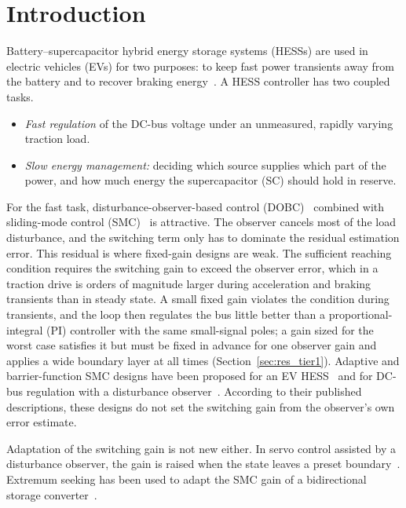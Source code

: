 \section{Introduction}\label{sec:intro}

Battery--supercapacitor hybrid energy storage systems (HESSs) are used in electric vehicles (EVs) for two purposes: to keep fast power transients away from the battery and to recover braking energy~\cite{khaligh2010,cao2012}. A HESS controller has two coupled tasks.
\begin{itemize}
\item \emph{Fast regulation} of the DC-bus voltage under an unmeasured, rapidly varying traction load.
\item \emph{Slow energy management:} deciding which source supplies which part of the power, and how much energy the supercapacitor (SC) should hold in reserve.
\end{itemize}

For the fast task, disturbance-observer-based control (DOBC)~\cite{chen2016dobc,li2014dobc} combined with sliding-mode control (SMC)~\cite{utkin2009,shtessel2014,ha2022torqueobs} is attractive. The observer cancels most of the load disturbance, and the switching term only has to dominate the residual estimation error. This residual is where fixed-gain designs are weak. The sufficient reaching condition requires the switching gain to exceed the observer error, which in a traction drive is orders of magnitude larger during acceleration and braking transients than in steady state. A small fixed gain violates the condition during transients, and the loop then regulates the bus little better than a proportional-integral (PI) controller with the same small-signal poles; a gain sized for the worst case satisfies it but must be fixed in advance for one observer gain and applies a wide boundary layer at all times (Section~\ref{sec:res_tier1}). Adaptive and barrier-function SMC designs have been proposed for an EV HESS~\cite{ojvt2025barrier} and for DC-bus regulation with a disturbance observer~\cite{bagherwal2024}. According to their published descriptions, these designs do not set the switching gain from the observer's own error estimate.

Adaptation of the switching gain is not new either. In servo control assisted by a disturbance observer, the gain is raised when the state leaves a preset boundary~\cite{tian2022adaptive}. Extremum seeking has been used to adapt the SMC gain of a bidirectional storage converter~\cite{trinh2023}.

